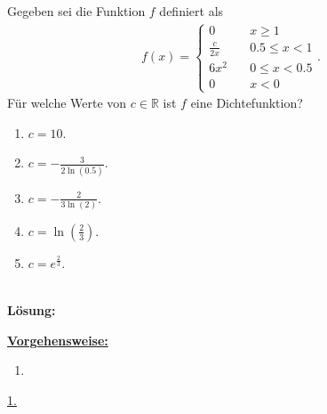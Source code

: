 \subsection*{}
Gegeben sei die Funktion $ f $ definiert als
\begin{align*}
	f(x)
	=
	\begin{cases}
		0 \quad &x \geq 1\\
		\frac{c}{2x} \quad &0.5 \leq x < 1\\
		6x^2 \quad &0 \leq x < 0.5\\
		0 \quad &x<0
	\end{cases}.
\end{align*}
Für welche Werte von $ c \in \mathbb{R} $ ist $ f $ eine Dichtefunktion?
\renewcommand{\labelenumi}{(\alph{enumi})}
\begin{enumerate}
	\item 
	$ c = 10$.
	\item 
	$ c= -\frac{3}{2 \ln(0.5)} $.
	\item
	$ c= -\frac{2}{3 \ln(2)} $.
	\item
	$ c = \ln \left(\frac{2}{3}\right) $.
	\item
	$ c = e^{\frac{2}{3}} $.
\end{enumerate}
\ \\
\textbf{Lösung:}
\begin{mdframed}
	\underline{\textbf{Vorgehensweise:}}
	\renewcommand{\labelenumi}{\theenumi.}
	\begin{enumerate}
		\item 
	\end{enumerate}
\end{mdframed}

\underline{1.}\\

\newpage

